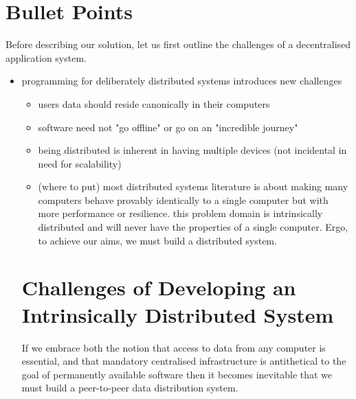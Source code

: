 \documentclass[sigplan,10pt]{acmart}
\begin{document}
\section{Bullet Points}

Before describing our solution, let us first outline the challenges of a decentralised application system.

\begin{itemize}
    \item programming for deliberately distributed systems introduces new challenges
    \begin{itemize}
        \item users data should reside canonically in their computers
        \item software need not "go offline" or go on an "incredible journey"
        \item being distributed is inherent in having multiple devices (not incidental in need for scalability)
        \item (where to put) most distributed systems literature is about making many computers behave provably identically to a single computer but with more performance or resilience. this problem domain is intrinsically distributed and will never have the properties of a single computer.
    Ergo, to achieve our aims, we must build a distributed system.
    \end{itemize}

\section{Challenges of Developing an Intrinsically Distributed System}

If we embrace both the notion that access to data from any computer is essential, and that mandatory centralised infrastructure is antithetical to the goal of permanently available software then it becomes inevitable that we must build a peer-to-peer data distribution system. 


\end{itemize}
\end{document}
